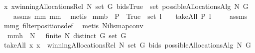 \begin{isabellebody}
{\isachardoublequoteopen}{\isacharparenleft}{\isacharpercent}x{\isachardot}\ x{\isasymin}winningAllocationsRel\ N\ {\isacharparenleft}set\ G{\isacharparenright}\ bids{\isacharparenright}{\isacharminus}{\isacharbackquote}{\isacharbraceleft}True{\isacharbraceright}\ {\isasyminter}\ set\ {\isacharparenleft}possibleAllocationsAlg{}\ N\ G{\isacharparenright}\ {\isasymnoteq}\ {\isacharbraceleft}{\isacharbraceright}{\isachardoublequoteclose}\isanewline
%
\isadelimproof
%
\endisadelimproof
%
\isatagproof
{}\isamarkupfalse%
\ assms\ mm{}{}\ mm{}{}\ \isamarkupfalse%
\ metis%
\endisatagproof
{\isafoldproof}%
%
\isadelimproof
\isanewline
%
\endisadelimproof
{}\isamarkupfalse%
\ mm{}{}b{\isacharcolon}\ \ {\isachardoublequoteopen}P\ {\isacharminus}{\isacharbackquote}\ {\isacharbraceleft}True{\isacharbraceright}\ {\isasyminter}\ set\ l\ {\isasymnoteq}\ {\isacharbraceleft}{\isacharbraceright}{\isachardoublequoteclose}\ \ {\isachardoublequoteopen}takeAll\ P\ l\ {\isasymnoteq}\ {\isacharbrackleft}{\isacharbrackright}{\isachardoublequoteclose}%
\isadelimproof
\ %
\endisadelimproof
%
\isatagproof
{}\isamarkupfalse%
\ assms\isanewline
mm{}{}g\ filterpositions{}{\isacharunderscore}def\ \isamarkupfalse%
\ {\isacharparenleft}metis\ Nil{\isacharunderscore}is{\isacharunderscore}map{\isacharunderscore}conv{\isacharparenright}%
\endisatagproof
{\isafoldproof}%
%
\isadelimproof
%
\endisadelimproof
\isanewline
{}\isamarkupfalse%
\ mm{}{}h{\isacharcolon}\ \ {\isachardoublequoteopen}N\ {\isasymnoteq}\ {\isacharbraceleft}{\isacharbraceright}{\isachardoublequoteclose}\ {\isachardoublequoteopen}finite\ N{\isachardoublequoteclose}\ {\isachardoublequoteopen}distinct\ G{\isachardoublequoteclose}\ {\isachardoublequoteopen}set\ G\ {\isasymnoteq}\ {\isacharbraceleft}{\isacharbraceright}{\isachardoublequoteclose}\ \ \isanewline
{\isachardoublequoteopen}takeAll\ {\isacharparenleft}{\isacharpercent}x{\isachardot}\ x\ {\isasymin}\ winningAllocationsRel\ N\ {\isacharparenleft}set\ G{\isacharparenright}\ bids{\isacharparenright}\ {\isacharparenleft}possibleAllocationsAlg{}\ N\ G{\isacharparenright}\ {\isasymnoteq}\ {\isacharbrackleft}{\isacharbrackright}{\isachardoublequoteclose}\isanewline
%
\isadelimproof
%
\endisadelimproof
%
\isatagproof
{}\isamarkupfalse%

\end{isabellebody}
